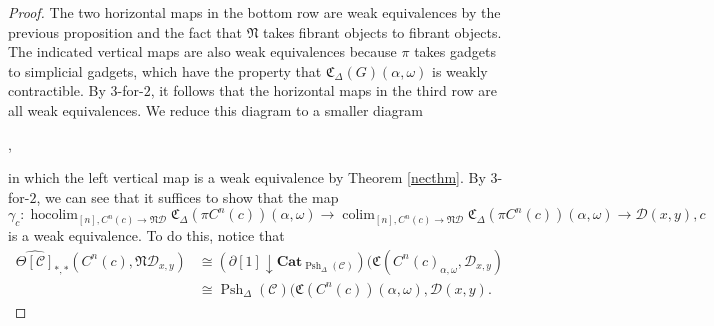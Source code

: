 \documentclass{amsart}
\numberwithin{equation}{section}
\theoremstyle{plain}   %
\theoremstyle{remark}
\theoremstyle{plain}
\DeclareMathOperator*{\coliml}{colim}
\newcommand{\Cat}{\ensuremath{\mathbf{Cat}}}
\newcommand{\overcat}[2]{{\left(#1\downarrow #2\right)}}
\DeclareMathOperator*{\hocoliml}{hocolim}
\newcommand{\cellset}{\ensuremath{\widehat{\Theta[\mathcal{C}]}}}
\newcommand{\spsh}{\ensuremath{\operatorname{Psh}_\Delta(\mathcal{C})}}
\begin{document}
\begin{proof}
	The two horizontal maps in the bottom row are weak equivalences by the previous proposition and the fact that \(\mathfrak{N}\) takes fibrant objects to fibrant objects.  The indicated vertical maps are also weak equivalences because \(\pi\) takes gadgets to simplicial gadgets, which have the property that \(\mathfrak{C}_\Delta(G)(\alpha,\omega)\) is weakly contractible.  By \(3\)-for-\(2\), it follows that the horizontal maps in the third row are all weak equivalences.  We reduce this diagram to a smaller diagram
	\begin{center}
		,
	\end{center}
	in which the left vertical map is a weak equivalence by Theorem \ref{necthm}. By \(3\)-for-\(2\), we can see that it suffices to show that the map
	\[\gamma_c: \hocoliml_{[n],C^n(c)\to \mathfrak{N}\mathcal{D}} \mathfrak{C}_\Delta(\pi C^n(c))(\alpha,\omega) \to \coliml_{[n],C^n(c)\to \mathfrak{N}\mathcal{D}} \mathfrak{C}_\Delta(\pi C^n(c))(\alpha,\omega)\to \mathcal{D}(x,y),c\]
	is a weak equivalence.
	To do this, notice that
	\begin{align*}
		\cellset_{\ast,\ast}(C^n(c), \mathfrak{N}\mathcal{D}_{x,y}) & \cong \overcat{\partial[1]}{\Cat_{\spsh}}(\mathfrak{C}(C^n(c)_{\alpha,\omega},\mathcal{D}_{x,y}) \\
		& \cong \spsh(\mathfrak{C}(C^n(c))(\alpha,\omega), \mathcal{D}(x,y).
	\end{align*}


\end{proof}
\end{document}

